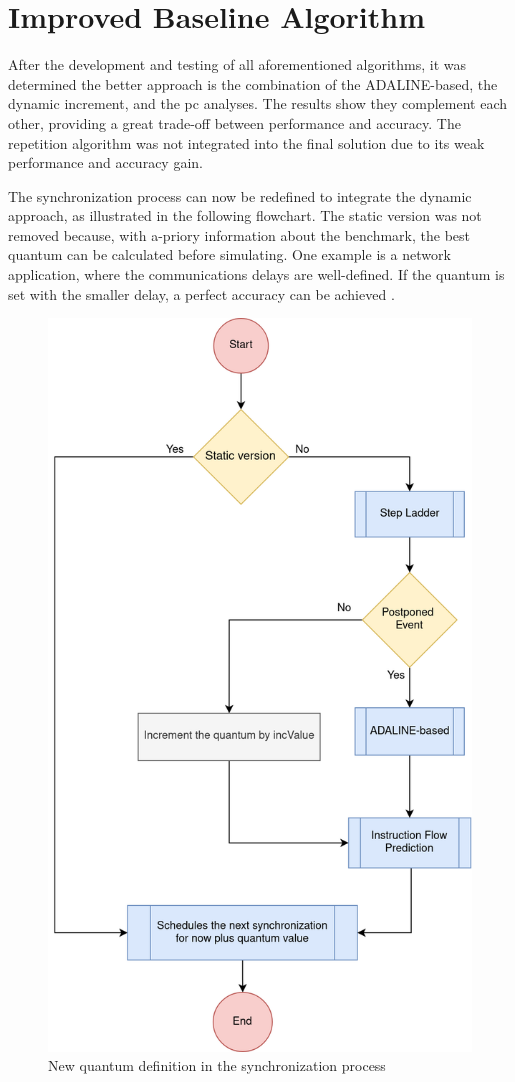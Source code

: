 


\section{Improved Baseline Algorithm}
\label{subsec::finalAlgorithm}

After the development and testing of all aforementioned algorithms, it was determined the better approach is the combination of the ADALINE-based, 
the dynamic increment, and the \gls{pc} analyses. The results show they complement each other, providing a great trade-off between performance 
and accuracy. The repetition algorithm was not integrated into the final solution due to its weak performance and accuracy gain. 

The synchronization process can now be redefined to integrate the dynamic approach, as illustrated in the following flowchart. 
The static version was not removed because, with a-priory information about the benchmark, 
the best quantum can be calculated before simulating. One example is a network application, where the communications delays are well-defined. 
If the quantum is set with the smaller delay, a perfect accuracy can be achieved \cite{dist-gem5}. 

\begin{figure}[H]
	\centering
 	\includegraphics[width=0.4\linewidth]{Images/NewGlobalSyncEventStatic.png}
 	\caption{New quantum definition in the synchronization process}
	\label{fig_NewGlobalSyncEventStatic}
\end{figure}

